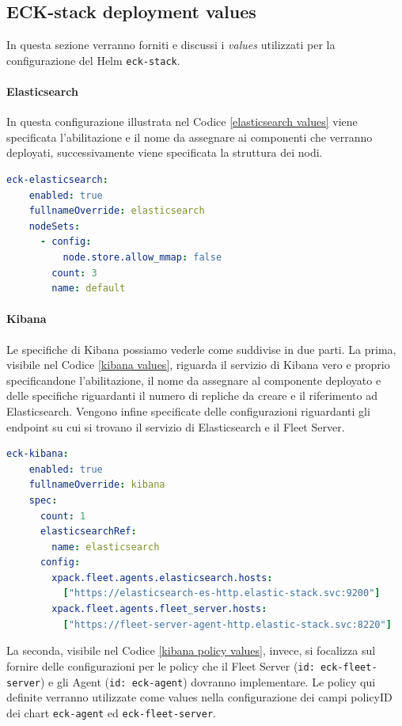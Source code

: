 \subsection{ECK-stack deployment values}
In questa sezione verranno forniti e discussi i \textit{values} utilizzati per la configurazione del Helm \texttt{eck-stack}.

\paragraph{Elasticsearch}
In questa configurazione illustrata nel Codice \ref{elasticsearch values} viene specificata l'abilitazione e il nome da assegnare ai componenti che verranno deployati, successivamente viene specificata la struttura dei nodi.
\begin{lstlisting}[language=yaml, caption= Elasticsearch yaml values \label{elasticsearch values}, basicstyle=\ttfamily]
  eck-elasticsearch:
    enabled: true
    fullnameOverride: elasticsearch
    nodeSets:
      - config:
          node.store.allow_mmap: false
        count: 3
        name: default

\end{lstlisting}

\paragraph{Kibana}
Le specifiche di Kibana possiamo vederle come suddivise in due parti.
La prima, visibile nel Codice \ref{kibana values}, riguarda il servizio di Kibana vero e proprio specificandone l'abilitazione, il nome da assegnare al componente deployato e delle specifiche riguardanti il numero di repliche da creare e il riferimento ad Elasticsearch. Vengono infine specificate delle configurazioni riguardanti gli endpoint su cui si trovano il servizio di Elasticsearch e il Fleet Server.

\begin{lstlisting}[language=yaml, caption= Kibana yaml values \label{kibana values}, basicstyle=\ttfamily]
  eck-kibana:
    enabled: true
    fullnameOverride: kibana
    spec:
      count: 1
      elasticsearchRef:
        name: elasticsearch
      config:
        xpack.fleet.agents.elasticsearch.hosts:
          ["https://elasticsearch-es-http.elastic-stack.svc:9200"]
        xpack.fleet.agents.fleet_server.hosts:
          ["https://fleet-server-agent-http.elastic-stack.svc:8220"]
\end{lstlisting}

La seconda, visibile nel Codice \ref{kibana policy values}, invece, si focalizza sul fornire delle configurazioni per le policy che il Fleet Server (\texttt{id: eck-fleet-server}) e gli Agent (\texttt{id: eck-agent}) dovranno implementare. Le policy qui definite verranno utilizzate come values nella configurazione dei campi policyID dei chart \texttt{eck-agent} ed \texttt{eck-fleet-server}.

